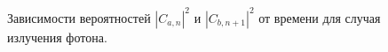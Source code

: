 \begin{figure}
\centering



\caption{Зависимости вероятностей $\left|C_{a, n}\right|^2$ и
  $\left|C_{b, n+1}\right|^2$ от времени для случая излучения фотона.}
\label{fig:part1:rabi}
\end{figure}
